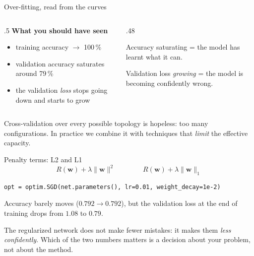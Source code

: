 \documentclass[aspectratio=169,10pt]{beamer}
\newcommand{\vw}{{\bm w}}
\begin{document}
\begin{frame}{Over-fitting, read from the curves}
\begin{columns}[T]
\begin{column}{.5\textwidth}
\textbf{What you should have seen}
\begin{itemize}\small
  \item training accuracy $\rightarrow$ 100\,\%
  \item validation accuracy saturates around 79\,\%
  \item the validation \emph{loss} stops going down and starts to \alert{grow}
\end{itemize}
\end{column}
\begin{column}{.48\textwidth}
\begin{keybox}
\small
Accuracy saturating = the model has learnt what it can.

Validation loss \emph{growing} = the model is becoming \alert{confidently wrong}.
\end{keybox}
\end{column}
\end{columns}
\vspace{.6em}
Cross-validation over every possible topology is hopeless: too many configurations.
In practice we combine it with techniques that \emph{limit} the effective capacity.
\end{frame}

\begin{frame}[fragile]{Penalty terms: L2 and L1}
$$R(\vw) + \lambda\|\vw\|^2 \qquad\qquad R(\vw) + \lambda\|\vw\|_1$$

\begin{lstlisting}
opt = optim.SGD(net.parameters(), lr=0.01, weight_decay=1e-2)
\end{lstlisting}

\begin{keybox}
\small
Accuracy barely moves ($0.792 \rightarrow 0.792$), but the validation loss at the end of
training drops from $1.08$ to $0.79$.

\medskip
The regularized network does not make fewer mistakes: it makes them \emph{less
confidently}. Which of the two numbers matters is a decision about your problem, not about
the method.
\end{keybox}
\end{frame}
\end{document}
